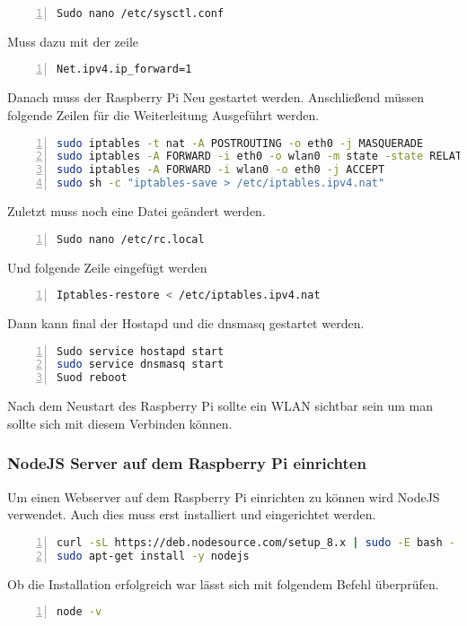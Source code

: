 \begin{lstlisting}[caption={Konfiguration IPV4 Schritt 1}, language={bash}, numbers=left]
Sudo nano /etc/sysctl.conf
\end{lstlisting}
Muss dazu mit der zeile
\begin{lstlisting}[caption={Konfiguration IPV4 Schritt 2}, language={bash}, numbers=left]
Net.ipv4.ip_forward=1
\end{lstlisting}
Danach muss der Raspberry Pi Neu gestartet werden.
Anschließend müssen folgende Zeilen für die Weiterleitung Ausgeführt werden.
\begin{lstlisting}[caption={Konfiguration IPV4 Schritt 3}, language={bash}, numbers=left]
sudo iptables -t nat -A POSTROUTING -o eth0 -j MASQUERADE
sudo iptables -A FORWARD -i eth0 -o wlan0 -m state -state RELATED,ESTABLISHED -j ACCEPT
sudo iptables -A FORWARD -i wlan0 -o eth0 -j ACCEPT
sudo sh -c "iptables-save > /etc/iptables.ipv4.nat"
\end{lstlisting}
Zuletzt muss noch eine Datei geändert werden.
\begin{lstlisting}[caption={Konfiguration IPV4 Schritt 4}, language={bash}, numbers=left]
Sudo nano /etc/rc.local
\end{lstlisting}
Und folgende Zeile eingefügt werden
\begin{lstlisting}[caption={Konfiguration IPV4 Schritt 5}, language={bash}, numbers=left]
Iptables-restore < /etc/iptables.ipv4.nat
\end{lstlisting}
Dann kann final der Hostapd und die dnsmasq gestartet werden.
\begin{lstlisting}[caption={Starten der neu installierten Packages}, language={bash}, numbers=left]
Sudo service hostapd start
sudo service dnsmasq start
Suod reboot
\end{lstlisting}
Nach dem Neustart des Raspberry Pi sollte ein \ac{WLAN} sichtbar sein um man sollte sich mit diesem Verbinden können.\cite{raspi1}\cite{raspi2}


\subsubsection{NodeJS Server auf dem Raspberry Pi einrichten}
Um einen Webserver auf dem Raspberry Pi einrichten zu können wird NodeJS verwendet. Auch dies muss erst installiert und eingerichtet werden.\cite{nodejs}
\begin{lstlisting}[caption={Installation NodeJS Schritt 1}, language={bash}, numbers=left]
curl -sL https://deb.nodesource.com/setup_8.x | sudo -E bash -
sudo apt-get install -y nodejs
\end{lstlisting}
Ob die Installation erfolgreich war lässt sich mit folgendem Befehl überprüfen.
\begin{lstlisting}[caption={Installation NodeJS Schritt 2}, language={bash}, numbers=left]
node -v
\end{lstlisting}



